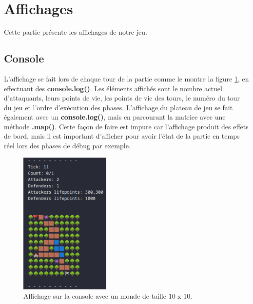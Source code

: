 \documentclass{article}
\begin{document}
\newpage
\section{Affichages}
Cette partie présente les affichages de notre jeu.

\subsection{Console}
    L'affichage se fait lors de chaque tour de la partie comme le montre la figure \ref{fig:terminal}, en effectuant des \textbf{console.log()}. Les éléments affichés sont le nombre actuel d'attaquants, leurs points de vie, les points de vie des tours, le numéro du tour du jeu et l'ordre d'exécution des phases. L'affichage du plateau de jeu se fait également avec un \textbf{console.log()}, mais en parcourant la matrice avec une méthode \textbf{.map()}. Cette façon de faire est impure car l'affichage produit des effets de bord, mais il est important d'afficher pour avoir l'état de la partie en temps réel lors des phases de débug par exemple.
\begin{figure}[!h]
    \centering
    \includegraphics[width=4.5cm]{terminal.png}
    \caption{Affichage sur la console avec un monde de taille 10 x 10.}
    \label{fig:terminal}
\end{figure}
\end{document}
